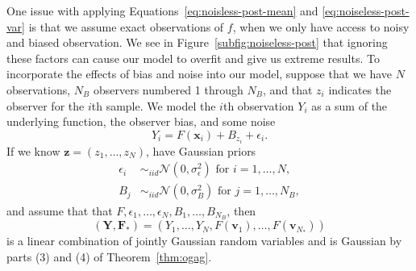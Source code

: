 One issue with applying Equations~\ref{eq:noisless-post-mean} and \ref{eq:noiseless-post-var} is that we assume exact observations of $f$, when we only have access to noisy and biased observation.
We see in Figure~\ref{subfig:noiseless-post} that ignoring these factors can cause our model to overfit and give us extreme results.
To incorporate the effects of bias and noise into our model, suppose that we have $N$ observations, $N_B$ observers numbered 1 through $N_B$, and that $z_i$ indicates the observer for the $i$th sample.
We model the $i$th observation $Y_i$ as a sum of the underlying function, the observer bias, and some noise
\begin{equation*}
    Y_i = F(\mathbf{x}_i) + B_{z_i} + \epsilon_i.
\end{equation*}
If we know $\mathbf{z} = (z_1, \dots, z_N)$, have Gaussian priors
\begin{align*}
    \epsilon_i & \sim_{iid} \mathcal{N}\left(0, \sigma^2_{\epsilon}\right) \text{ for $i = 1, \dots, N$}, \\
    B_j & \sim_{iid} \mathcal{N}\left(0, \sigma_{B}^2\right) \text{ for $j = 1, \dots, N_B$},
\end{align*}
and assume that that $F, \epsilon_1, \dots, \epsilon_N, B_1, \dots, B_{N_B}$, then
\begin{equation*}
    (\mathbf{Y}, \mathbf{F}_*) = (Y_1, \dots, Y_N, F(\mathbf{v}_1), \dots, F(\mathbf{v}_{N_*}))
\end{equation*}
is a linear combination of jointly Gaussian random variables
and is Gaussian by parts (3) and (4) of Theorem~\ref{thm:ogag}.

